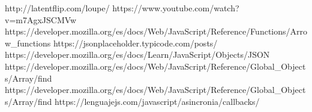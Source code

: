 http://latentflip.com/loupe/
https://www.youtube.com/watch?v=m7AgxJSCMVw
https://developer.mozilla.org/es/docs/Web/JavaScript/Reference/Functions/Arrow_functions
https://jsonplaceholder.typicode.com/posts/
https://developer.mozilla.org/es/docs/Learn/JavaScript/Objects/JSON
https://developer.mozilla.org/es/docs/Web/JavaScript/Reference/Global_Objects/Array/find
https://developer.mozilla.org/es/docs/Web/JavaScript/Reference/Global_Objects/Array/find
https://lenguajejs.com/javascript/asincronia/callbacks/